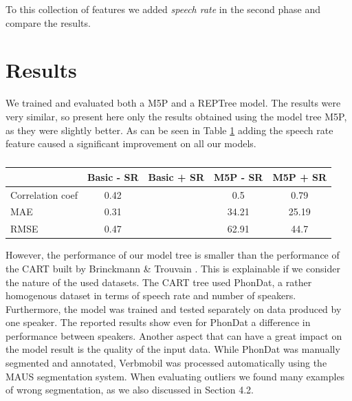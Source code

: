 \documentclass[a4paper]{scrreprt}
\begin{document}
To this collection of features we added \textit{speech rate} in the second phase and compare the results. 

\section{Results}
We trained and evaluated both a M5P and a REPTree model. The results were very similar, so present here only the results obtained using the model tree M5P, as they were slightly better. As can be seen in Table \ref{tab:perfM} adding the speech rate feature caused a significant improvement on all our models. 

\begin{table}[htbp]
\centering
\begin{tabular}{|l|c|c|c|c|}

\hline
	 & Basic - SR & Basic + SR & M5P - SR & M5P + SR \\
\hline
\hline
Correlation coef 		& 0.42  &  & 0.5 & 0.79\\
	\hline
MAE  &  0.31 & & 34.21 & 25.19 \\
	\hline
RMSE  &  0.47 & & 62.91 & 44.7 \\
	\hline

\end{tabular}
\caption{} 
\label{tab:perfM}
\end{table}

However, the performance of our model tree is smaller than the performance of the CART built by Brinckmann \& Trouvain \cite{Brinckman2003}. This is explainable if we consider the nature of the used datasets. The CART tree used PhonDat, a rather homogenous dataset in terms of speech rate and number of speakers. Furthermore, the model was trained and tested separately on data produced by one speaker. The reported results show even for PhonDat a difference in performance between speakers. Another aspect that can have a great impact on the model result is the quality of the input data. While PhonDat was manually segmented and annotated, Verbmobil was processed automatically using the MAUS segmentation system. When evaluating outliers we found many examples of wrong segmentation, as we also discussed in Section 4.2.
\end{document}

